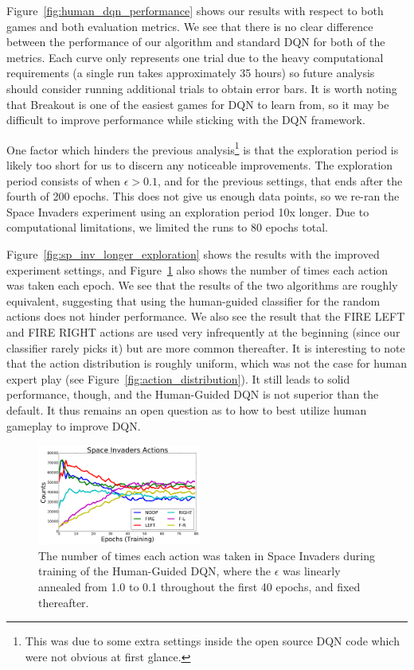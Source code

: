 \documentclass[letterpaper, 10pt, conference]{ieeeconf}
\begin{document}
Figure~\ref{fig:human_dqn_performance} shows our results with respect to both
games and both evaluation metrics. We see that there is no clear difference
between the performance of our algorithm and standard DQN for both of the
metrics. Each curve only represents one trial due to the heavy computational
requirements (a single run takes approximately 35 hours) so future analysis
should consider running additional trials to obtain error bars. It is worth
noting that Breakout is one of the easiest games for DQN to learn from, so it
may be difficult to improve performance while sticking with the DQN framework.

One factor which hinders the previous analysis\footnote{This was due to some
extra settings inside the open source DQN code which were not obvious at first
glance.} is that the exploration period is likely too short for us to discern
any noticeable improvements. The exploration period consists of when
$\epsilon>0.1$, and for the previous settings, that ends after the fourth of 200
epochs. This does not give us enough data points, so we re-ran the Space
Invaders experiment using an exploration period 10x longer. Due to computational
limitations, we limited the runs to 80 epochs total.

Figure~\ref{fig:sp_inv_longer_exploration} shows the results with the improved
experiment settings, and Figure~\ref{fig:actions_taken} also shows the
number of times each action was taken each epoch. We see that the results of the
two algorithms are roughly equivalent, suggesting that using the human-guided
classifier for the random actions does not hinder performance. We also see the
result that the FIRE LEFT and FIRE RIGHT actions are used very infrequently at
the beginning (since our classifier rarely picks it) but are more common
thereafter. It is interesting to note that the action distribution is roughly
uniform, which was not the case for human expert play (see
Figure~\ref{fig:action_distribution}). It still leads to solid performance,
though, and the Human-Guided DQN is not superior than the default. It thus
remains an open question as to how to best utilize human gameplay to improve
DQN.

\begin{figure}[t]
\centering
\includegraphics[width=0.48\textwidth]{figures/fig_si_actions.png}
\caption{\footnotesize
The number of times each action was taken in Space Invaders during training of
the Human-Guided DQN, where the $\epsilon$ was linearly annealed from 1.0 to 0.1
throughout the first 40 epochs, and fixed thereafter.
}
\label{fig:actions_taken}
\end{figure}
\end{document}
